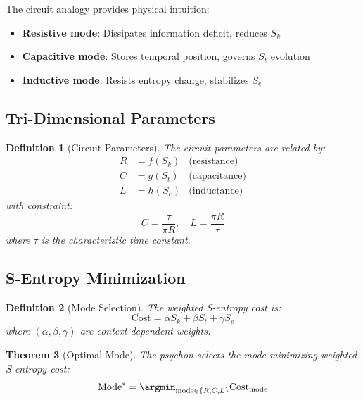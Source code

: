 \documentclass[twocolumn,amsmath,amssymb,aps,prl,superscriptaddress]{revtex4-2}
\newtheorem{theorem}{Theorem}[section]
\newtheorem{definition}[theorem]{Definition}
\newcommand{\Sk}{S_k}
\newcommand{\St}{S_t}
\newcommand{\Se}{S_e}
\begin{document}
The circuit analogy provides physical intuition:
\begin{itemize}
\item \textbf{Resistive mode}: Dissipates information deficit, reduces $\Sk$
\item \textbf{Capacitive mode}: Stores temporal position, governs $\St$ evolution
\item \textbf{Inductive mode}: Resists entropy change, stabilizes $\Se$
\end{itemize}

\subsection{Tri-Dimensional Parameters}

\begin{definition}[Circuit Parameters]
The circuit parameters are related by:
\begin{align}
R &= f(\Sk) & \text{(resistance)} \\
C &= g(\St) & \text{(capacitance)} \\
L &= h(\Se) & \text{(inductance)}
\end{align}
with constraint:
\begin{equation}
C = \frac{\tau}{\pi R}, \quad L = \frac{\pi R}{\tau}
\end{equation}
where $\tau$ is the characteristic time constant.
\end{definition}

\subsection{S-Entropy Minimization}

\begin{definition}[Mode Selection]
The weighted S-entropy cost is:
\begin{equation}
\text{Cost} = \alpha \Sk + \beta \St + \gamma \Se
\end{equation}
where $(\alpha, \beta, \gamma)$ are context-dependent weights.
\end{definition}

\begin{theorem}[Optimal Mode]
The psychon selects the mode minimizing weighted S-entropy cost:
\begin{equation}
\text{Mode}^* = \argmin_{\text{mode} \in \{R, C, L\}} \text{Cost}_{\text{mode}}
\end{equation}
\end{theorem}
\end{document}
